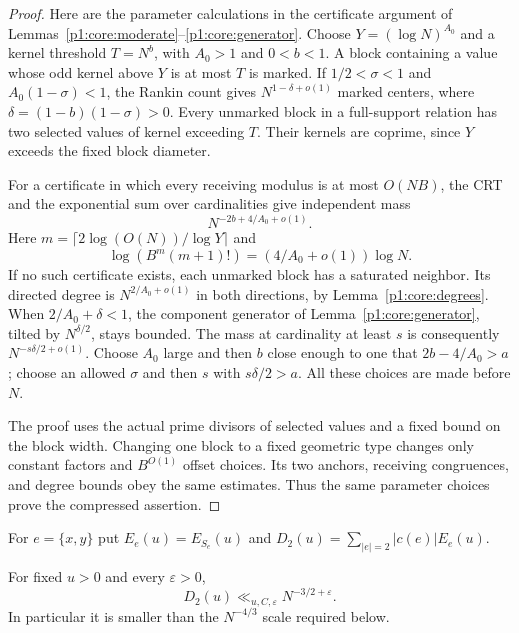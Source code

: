 \begin{proof}
Here are the parameter calculations in the certificate argument of
Lemmas~\ref{p1:core:moderate}--\ref{p1:core:generator}.
Choose $Y=(\log N)^{A_0}$ and a kernel threshold $T=N^b$, with
$A_0>1$ and $0<b<1$. A block containing a value whose odd kernel above
$Y$ is at most $T$ is marked. If
$1/2<\sigma<1$ and $A_0(1-\sigma)<1$, the Rankin count gives
$N^{1-\delta+o(1)}$ marked centers, where
$\delta=(1-b)(1-\sigma)>0$.
Every unmarked block in a full-support relation has two selected
values of kernel exceeding $T$. Their kernels are coprime, since
$Y$ exceeds the fixed block diameter.

For a certificate in which every receiving modulus is at most $O(NB)$,
the CRT and the exponential sum over cardinalities give independent
mass
\[
 N^{-2b+4/A_0+o(1)}.
\]
Here $m=\lceil2\log(O(N))/\log Y\rceil$ and
\[
 \log(B^m(m+1)!)=(4/A_0+o(1))\log N.
\]
If no such certificate exists, each unmarked block has a saturated
neighbor. Its directed degree is $N^{2/A_0+o(1)}$ in both directions,
by Lemma~\ref{p1:core:degrees}.
When $2/A_0+\delta<1$, the component generator of
Lemma~\ref{p1:core:generator}, tilted by $N^{\delta/2}$, stays bounded.
The mass at cardinality at least $s$ is consequently
$N^{-s\delta/2+o(1)}$.
Choose $A_0$ large and then $b$ close enough to one that
$2b-4/A_0>a$; choose an allowed $\sigma$ and then $s$ with
$s\delta/2>a$. All these choices are made before $N$.

The proof uses the actual prime divisors of selected values and a fixed
bound on the block width. Changing one block to a fixed geometric type
changes only constant factors and $B^{O(1)}$ offset choices. Its two
anchors, receiving congruences, and degree bounds obey the same estimates.
Thus the same parameter choices prove the compressed assertion.
\end{proof}

For $e=\{x,y\}$ put $E_e(u)=E_{S_e}(u)$ and
$D_2(u)=\sum_{|e|=2}|c(e)|E_e(u)$.

\begin{proposition}
\label{p13:transfer:pair-deficit}
For fixed $u>0$ and every $\varepsilon>0$,
\begin{equation}
 D_2(u)\ll_{u,C,\varepsilon}N^{-3/2+\varepsilon}.
 \label{p13:transfer:pair-deficit-bound}
\end{equation}
In particular it is smaller than the $N^{-4/3}$ scale required below.
\end{proposition}

